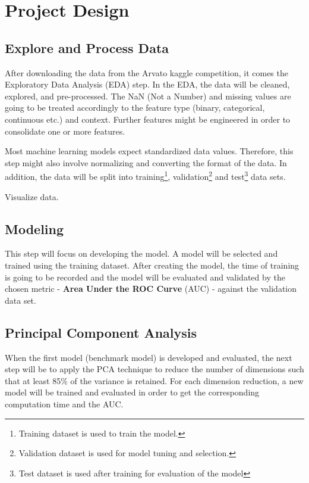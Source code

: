 \documentclass[10pt,twoside,twocolumn,nofonttune,a4paper,journal,compsoc,english,french,spanish]{IEEEtran}
\begin{document}
\hypertarget{project-design}{%
\section{Project Design}\label{project-design}}

\hypertarget{explore-and-process-data}{%
\subsection{Explore and Process Data}\label{explore-and-process-data}}

After downloading the data from the Arvato kaggle
competition\cite{arvato_kaggle_competition}, it comes the Exploratory
Data Analysis (EDA) step. In the EDA, the data will be cleaned,
explored, and pre-processed. The NaN (Not a Number) and missing values
are going to be treated accordingly to the feature type (binary,
categorical, continuous etc.) and context. Further features might be
engineered in order to consolidate one or more features.

Most machine learning models expect standardized data values. Therefore,
this step might also involve normalizing and converting the format of
the data. In addition, the data will be split into training\footnote{Training
  dataset is used to train the model.}, validation\footnote{Validation
  dataset is used for model tuning and selection.} and test\footnote{Test
  dataset is used after training for evaluation of the model} data sets.

Visualize data.

\hypertarget{modeling}{%
\subsection{Modeling}\label{modeling}}

This step will focus on developing the model. A model will be selected
and trained using the training dataset. After creating the model, the
time of training is going to be recorded and the model will be evaluated
and validated by the chosen metric - \textbf{Area Under the ROC Curve}
(AUC) - against the validation data set.

\hypertarget{principal-component-analysis}{%
\subsection{Principal Component
Analysis}\label{principal-component-analysis}}

When the first model (benchmark model) is developed and evaluated, the
next step will be to apply the PCA technique to reduce the number of
dimensions such that at least 85\% of the variance is retained. For each
dimension reduction, a new model will be trained and evaluated in order
to get the corresponding computation time and the AUC.




\end{document}
